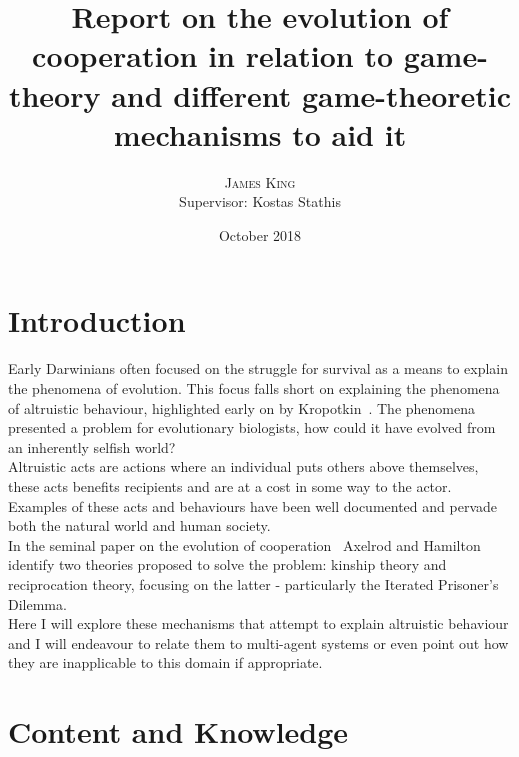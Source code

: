 \documentclass[twoside,twocolumn]{article}
\title{Report on the evolution of cooperation in relation to game-theory and different game-theoretic mechanisms to aid it} %
\author{%
\textsc{James King} \\%
\normalsize Supervisor: Kostas Stathis \\ %
}
\date{October 2018} %
\begin{document}


\maketitle


\section{Introduction}
Early Darwinians often focused on the struggle for survival as a means to explain the phenomena of evolution. This focus falls short on explaining the phenomena of altruistic behaviour, highlighted early on by Kropotkin~\cite{arithmetics_of_mutual_help}. The phenomena presented a problem for evolutionary biologists, how could it have evolved from an inherently selfish world?\\
Altruistic acts are actions where an individual puts others above themselves, these acts benefits recipients and are at a cost in some way to the actor. Examples of these acts and behaviours have been well documented and pervade both the natural world and human society.\\
In the seminal paper on the evolution of cooperation~\cite{evolution_of_cooperation} Axelrod and Hamilton identify two theories proposed to solve the problem: kinship theory and reciprocation theory, focusing on the latter - particularly the Iterated Prisoner's Dilemma.\\ 
Here I will explore these mechanisms that attempt to explain altruistic behaviour and I will endeavour to relate them to multi-agent systems or even point out how they are inapplicable to this domain if appropriate.\\


\section{Content and Knowledge}
\end{document}

